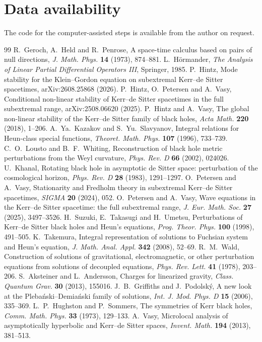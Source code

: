 \documentclass[11pt]{amsart}
\theoremstyle{definition}
\theoremstyle{remark}
\numberwithin{equation}{section}
\begin{document}
\section*{Data availability}
The code for the computer-assisted steps is available from the author on request.

\begin{thebibliography}{99}
 R.~Geroch, A.~Held and R.~Penrose, A space-time calculus based on pairs of null directions,
\emph{J. Math. Phys.} \textbf{14} (1973), 874--881.
 L.~H\"ormander, \emph{The Analysis of Linear Partial Differential Operators III}, Springer, 1985.
 P.~Hintz, Mode stability for the Klein--Gordon equation on subextremal Kerr--de Sitter spacetimes,
arXiv:2608.25868 (2026).
 P.~Hintz, O.~Petersen and A.~Vasy, Conditional non-linear stability of Kerr--de Sitter spacetimes in
the full subextremal range, arXiv:2508.06620 (2025).
 P.~Hintz and A.~Vasy, The global non-linear stability of the Kerr--de Sitter family of black holes,
\emph{Acta Math.} \textbf{220} (2018), 1--206.
 A.~Ya.~Kazakov and S.~Yu.~Slavyanov, Integral relations for Heun-class special functions,
\emph{Theoret. Math. Phys.} \textbf{107} (1996), 733--739.
 C.~O.~Lousto and B.~F.~Whiting, Reconstruction of black hole metric perturbations from the Weyl
curvature, \emph{Phys. Rev. D} \textbf{66} (2002), 024026.
 U.~Khanal, Rotating black hole in asymptotic de Sitter space: perturbation of the cosmological
horizon, \emph{Phys. Rev. D} \textbf{28} (1983), 1291--1297.
 O.~Petersen and A.~Vasy, Stationarity and Fredholm theory in subextremal Kerr--de Sitter spacetimes,
\emph{SIGMA} \textbf{20} (2024), 052.
 O.~Petersen and A.~Vasy, Wave equations in the Kerr--de Sitter spacetime: the full subextremal range,
\emph{J. Eur. Math. Soc.} \textbf{27} (2025), 3497--3526.
 H.~Suzuki, E.~Takasugi and H.~Umetsu, Perturbations of Kerr--de Sitter black holes and Heun's
equations, \emph{Prog. Theor. Phys.} \textbf{100} (1998), 491--505.
 K.~Takemura, Integral representation of solutions to Fuchsian system and Heun's equation,
\emph{J. Math. Anal. Appl.} \textbf{342} (2008), 52--69.
 R.~M.~Wald, Construction of solutions of gravitational, electromagnetic, or other perturbation
equations from solutions of decoupled equations, \emph{Phys. Rev. Lett.} \textbf{41} (1978), 203--206.
 S.~Aksteiner and L.~Andersson, Charges for linearized gravity, \emph{Class. Quantum Grav.} \textbf{30}
(2013), 155016.
 J.~B.~Griffiths and J.~Podolsk\'y, A new look at the Pleba\'nski--Demia\'nski family of solutions,
\emph{Int. J. Mod. Phys. D} \textbf{15} (2006), 335--369.
 L.~P.~Hughston and P.~Sommers, The symmetries of Kerr black holes, \emph{Comm. Math. Phys.} \textbf{33}
(1973), 129--133.
 A.~Vasy, Microlocal analysis of asymptotically hyperbolic and Kerr--de Sitter spaces, \emph{Invent.
Math.} \textbf{194} (2013), 381--513.
\end{thebibliography}
\end{document}
